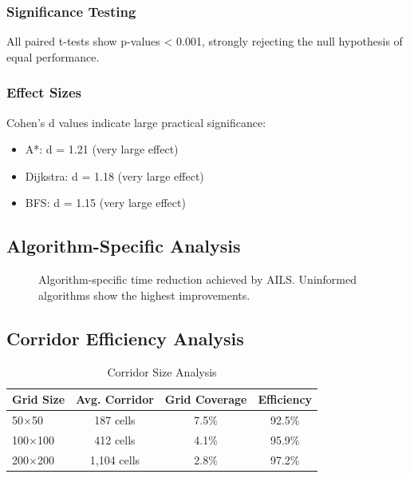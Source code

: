 \documentclass[journal]{IEEEtran}
\begin{document}
\subsubsection{Significance Testing}
All paired t-tests show p-values < 0.001, strongly rejecting the null hypothesis of equal performance.

\subsubsection{Effect Sizes}
Cohen's d values indicate large practical significance:
\begin{itemize}
\item A*: d = 1.21 (very large effect)
\item Dijkstra: d = 1.18 (very large effect)
\item BFS: d = 1.15 (very large effect)
\end{itemize}

\subsection{Algorithm-Specific Analysis}

\begin{figure}[h]
\centering
{}
\caption{Algorithm-specific time reduction achieved by AILS. Uninformed algorithms show the highest improvements.}
\label{fig:algorithm_improvements}
\end{figure}

\subsection{Corridor Efficiency Analysis}

\begin{table}[h]
\centering
\caption{Corridor Size Analysis}
\label{tab:corridor_analysis}
\begin{tabular}{lccc}
\toprule
Grid Size & Avg. Corridor & Grid Coverage & Efficiency \\
\midrule
50×50 & 187 cells & 7.5\% & 92.5\% \\
100×100 & 412 cells & 4.1\% & 95.9\% \\
200×200 & 1,104 cells & 2.8\% & 97.2\% \\
\bottomrule
\end{tabular}
\end{table}
\end{document}
